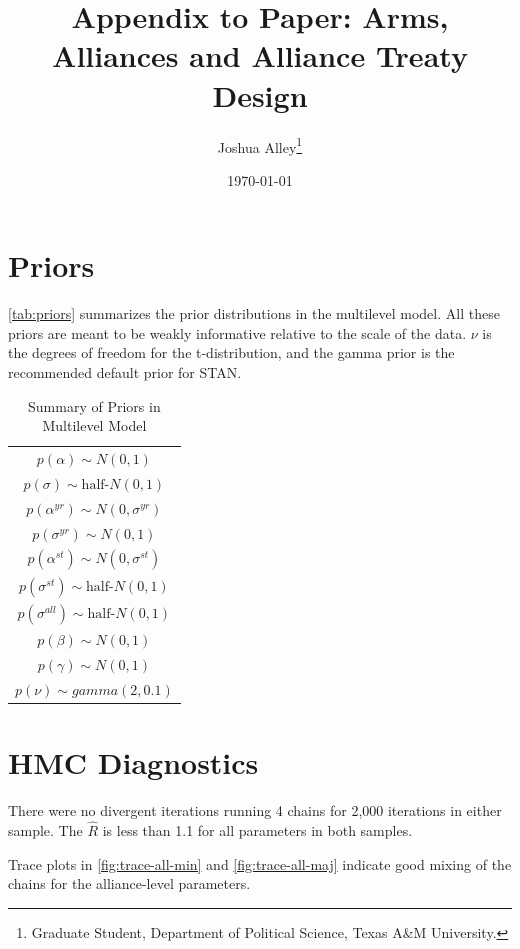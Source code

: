 \documentclass[12pt]{article}
\title{\textbf{Appendix to Paper: Arms, Alliances and Alliance Treaty Design}}
\author{Joshua Alley\footnote{Graduate Student,
Department of Political Science, Texas A\&M University.}}
\date{{\normalsize \today}}
\begin{document}
\maketitle 

\doublespace 



\section{Priors}

\autoref{tab:priors} summarizes the prior distributions in the multilevel model. 
All these priors are meant to be weakly informative relative to the scale of the data. 
$\nu$ is the degrees of freedom for the t-distribution, and the gamma prior is the recommended default prior for STAN. 

\begin{table} %
\begin{center}
\begin{tabular}{c} 
$ p(\alpha) \sim N(0, 1)$  \\
$ p(\sigma) \sim \mbox{half-}N(0, 1) $ \\
$ p(\alpha^{yr}) \sim N(0, \sigma^{yr}) $ \\ 
$ p(\sigma^{yr}) \sim N(0, 1) $ \\
$ p(\alpha^{st}) \sim N(0, \sigma^{st}) $ \\ 
$ p(\sigma^{st}) \sim \mbox{half-}N(0, 1) $ \\ 
$ p(\sigma^{all}) \sim \mbox{half-}N(0, 1) $ \\
$ p(\beta) \sim N(0, 1) $ \\
$ p(\gamma) \sim N(0, 1) $ \\ 
$ p(\nu) \sim gamma(2, 0.1)$ 
\end{tabular} 
\caption{Summary of Priors in Multilevel Model} 
\label{tab:priors}
\end{center} 
\end{table} 


\section{HMC Diagnostics}

There were no divergent iterations running 4 chains for 2,000 iterations in either sample. The $\hat{R}$ is less than 1.1 for all parameters in both samples. 

Trace plots in \autoref{fig:trace-all-min} and \autoref{fig:trace-all-maj} indicate good mixing of the chains for the alliance-level parameters. 
\end{document}
